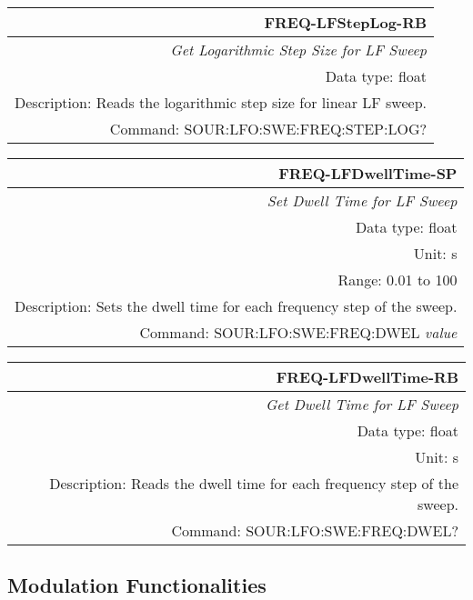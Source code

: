 \documentclass[openany]{article}
\begin{document}
		\begin{tabular}{N}
			\hline
			\bfseries FREQ-LFStepLog-RB \\ \hline
			\emph{Get Logarithmic Step Size for LF Sweep} \\
			Data type: float \\
			Description: Reads the logarithmic step size for linear LF sweep. \\
			Command: SOUR:LFO:SWE:FREQ:STEP:LOG? \\

		\end{tabular}
%
		\begin{tabular}{N}
			\hline
			\bfseries FREQ-LFDwellTime-SP \\ \hline
			\emph{Set Dwell Time for LF Sweep} \\
			Data type: float \\
			Unit: s \\
			Range: 0.01 to 100 \\
			Description: Sets the dwell time for each frequency step of the sweep.\\
			Command: SOUR:LFO:SWE:FREQ:DWEL \emph{value} \\
			
		\end{tabular}


		\begin{tabular}{N}
			\hline
			\bfseries FREQ-LFDwellTime-RB \\ \hline
			\emph{Get Dwell Time for LF Sweep} \\
			Data type: float \\
			Unit: s \\
			Description: Reads the dwell time for each frequency step of the sweep. \\
			Command: SOUR:LFO:SWE:FREQ:DWEL? \\

		\end{tabular}
%
	\subsection{Modulation Functionalities}\label{pvgroup:function} %

		\paragraph{} %
\end{document}
